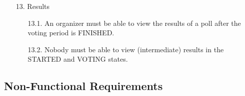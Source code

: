\begin{enumerate}
\item[13.] Results

	\begin{enumerate}
	\item[13.1.] An organizer must be able to view the results of a poll after the voting period is FINISHED.
	
	
	\item[13.2.] Nobody must be able to view (intermediate) results in the STARTED and VOTING states.
	\end{enumerate}



\end{enumerate}

\subsection{Non-Functional Requirements}

